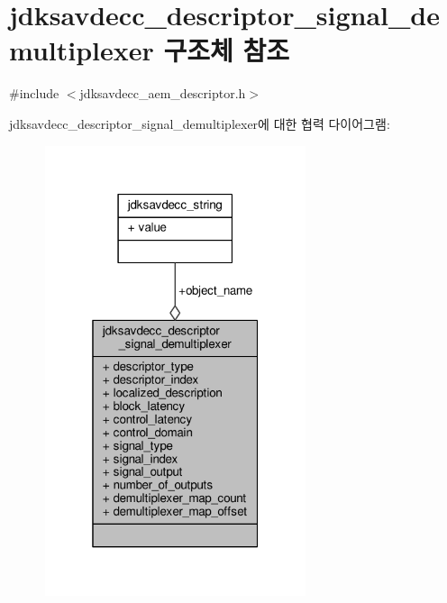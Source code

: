\hypertarget{structjdksavdecc__descriptor__signal__demultiplexer}{}\section{jdksavdecc\+\_\+descriptor\+\_\+signal\+\_\+demultiplexer 구조체 참조}
\label{structjdksavdecc__descriptor__signal__demultiplexer}


{\ttfamily \#include $<$jdksavdecc\+\_\+aem\+\_\+descriptor.\+h$>$}



jdksavdecc\+\_\+descriptor\+\_\+signal\+\_\+demultiplexer에 대한 협력 다이어그램\+:
\nopagebreak
\begin{figure}[H]
\begin{center}
\leavevmode
\includegraphics[width=217pt]{structjdksavdecc__descriptor__signal__demultiplexer__coll__graph}
\end{center}
\end{figure}

